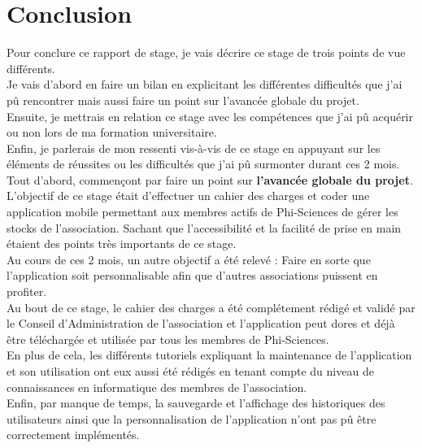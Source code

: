 \documentclass[11pt, twoside]{article}
\begin{document}
\section{Conclusion}
Pour conclure ce rapport de stage, je vais décrire ce stage de trois points de vue différents.\vspace*{0.2cm}\\
Je vais d'abord en faire un bilan en explicitant les différentes difficultés que j'ai pû rencontrer mais aussi faire un point sur l'avancée globale du projet.\\
Ensuite, je mettrais en relation ce stage avec les compétences que j'ai pû acquérir ou non lors de ma formation universitaire.\\
Enfin, je parlerais de mon ressenti vis-à-vis de ce stage en appuyant sur les éléments de réussites ou les difficultés que j'ai pû surmonter durant ces 2 mois.
\vspace*{0.3cm}\\
Tout d'abord, commençont par faire un point sur \textbf{l'avancée globale du projet}.
\vspace*{0.2cm}\\
L'objectif de ce stage était d'effectuer un cahier des charges et coder une application mobile permettant aux membres actifs de Phi-Sciences de gérer les stocks de l'association.
Sachant que l'accessibilité et la facilité de prise en main étaient des points très importants de ce stage.
\vspace*{0.2cm}\\
Au cours de ces 2 mois, un autre objectif a été relevé : Faire en sorte que l'application soit personnalisable afin que d'autres associations puissent en profiter.
\vspace*{0.2cm}\\
Au bout de ce stage, le cahier des charges a été complétement rédigé et validé par le Conseil d'Administration de l'association et l'application peut dores et déjà être téléchargée et utilisée par tous les membres de Phi-Sciences.\\
En plus de cela, les différents tutoriels expliquant la maintenance de l'application et son utilisation ont eux aussi été rédigés en tenant compte du niveau de connaissances en informatique des membres de l'association.
\vspace*{0.2cm}\\
Enfin, par manque de temps, la sauvegarde et l'affichage des historiques des utilisateurs ainsi que la personnalisation de l'application n'ont pas pû être correctement implémentés.\\
\end{document}
